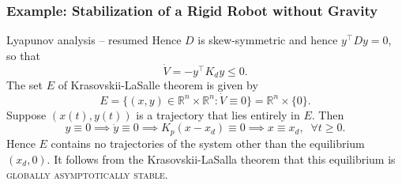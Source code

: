 \begin{frame}
    \frametitle{Example: Stabilization of a Rigid Robot without Gravity}

    \begin{block}{Lyapunov analysis -- resumed}
        Hence $D$ is skew-symmetric and hence $y^\top D y = 0$, so that
        \[\dot{V} = -y^\top K_d y \leq 0. \] The set $E$ of Krasovskii-LaSalle
        theorem is given by \[ E = \{ (x,y) \in \mathbb{R}^n \times
        \mathbb{R}^n: \dot{V} \equiv 0 \} = \mathbb{R}^n \times \{0\}. \]
        Suppose $(x(t), y(t))$ is a trajectory that lies entirely in $E$. Then
        \[ y \equiv 0 \implies \dot{y} \equiv 0 \implies K_p(x-x_d) \equiv 0
        \implies x \equiv x_d, \;\; \forall t \geq 0. \] Hence $E$ contains no 
        trajectories of the system other than the equilibrium $(x_d, 0)$. It 
        follows from the Krasovskii-LaSalla theorem that this equilibrium is 
        \textsc{globally asymptotically stable}.
    \end{block}
\end{frame}

\endgroup